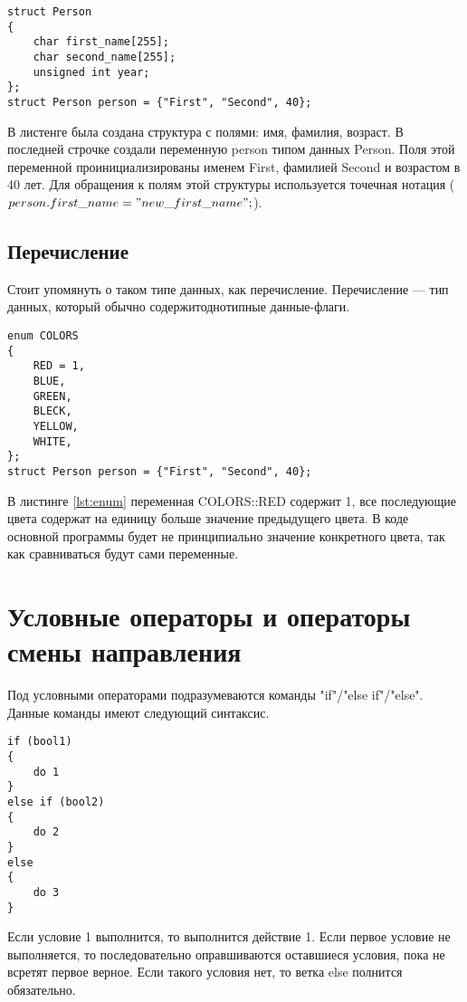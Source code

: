 \documentclass{bmstu}
\begin{document}
\begin{lstlisting}[caption={Структура персоны}, label={lst:struct},]
struct Person
{
    char first_name[255];
    char second_name[255];
    unsigned int year;
};
struct Person person = {"First", "Second", 40};
\end{lstlisting}

В листенге была создана структура с полями: имя, фамилия, возраст.
В последней строчке создали переменную person типом данных Person.
Поля этой переменной проинициализированы именем First, фамилией Second и возрастом в 40 лет.
Для обращения к полям этой структуры используется точечная нотация ($person.first\_name = "new\_first\_name";$). 

\subsection{Перечисление}

Стоит упомянуть о таком типе данных, как перечисление.
Перечисление --- тип данных, который обычно содержитоднотипные данные-флаги.

\begin{lstlisting}[caption={Перечисление}, label={lst:enum},]
enum COLORS
{
    RED = 1,
    BLUE,
    GREEN,
    BLECK,
    YELLOW,
    WHITE,
};
struct Person person = {"First", "Second", 40};
\end{lstlisting}

В листинге \ref{lst:enum} переменная COLORS::RED содержит 1, все последующие цвета содержат на единицу больше значение предыдущего цвета.
В коде основной программы будет не принципиально значение конкретного цвета, так как сравниваться будут сами переменные.

\section{Условные операторы и операторы смены направления}

Под условными операторами подразумеваются команды "if"/"else if"/"else". 
Данные команды имеют следующий синтаксис.


\begin{lstlisting}[caption={Условный оператор}, label={lst:if},]
if (bool1) 
{
    do 1
}  
else if (bool2) 
{
    do 2
} 
else 
{
    do 3
}
\end{lstlisting}

Если условие 1 выполнится, то выполнится действие 1.
Если первое условие не выполняется, то последовательно оправшиваются оставшиеся условия, пока не всретят первое верное.
Если такого условия нет, то ветка else полнится обязательно.
\end{document}
